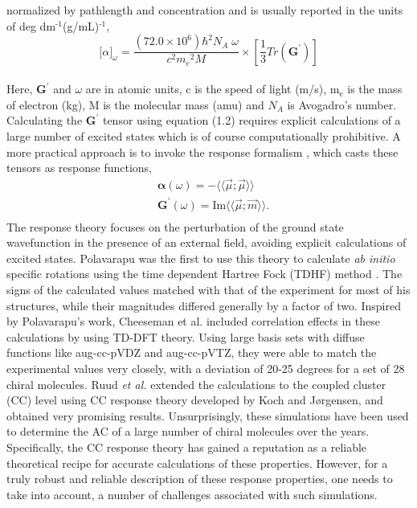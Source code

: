 normalized by pathlength and concentration and is usually reported in the units of deg dm$^{\text{-1}}$(g/mL)$^{\text{-1}}$,\cite{Crawford06}
\\
\begin{equation}
{\lbrack\alpha\rbrack}_{\omega} = \frac{(72.0 \times 10^6){\hbar}^2 N_A\;\omega}{c^2{m_e}^2 M} \times \left[ \frac{1}{3}Tr(\textbf{G}^\prime)\right]
\end{equation}
\\
Here, $\textbf{G}^\prime$ and $\omega$ are in atomic units, c is the speed of light (m/s), m$_{\text{e}}$ is the 
mass of electron (kg), M is the molecular mass (amu) and $N_A$ is Avogadro's number. Calculating the 
$\textbf{G}^\prime$ tensor using equation (1.2) requires explicit calculations of a large number of 
excited states which is of course computationally prohibitive. A more practical approach is to invoke the response formalism
\cite{Kobayashi94,Koch90}, which casts these tensors as response functions,
\begin{equation}
\begin{split}
&\bm{\alpha}(\omega) = -\langle\langle\vec{\mu};\vec{\mu}\rangle\rangle\\
&\textbf{G}^{\prime}(\omega) = \text{Im}\langle\langle\vec{\mu};\vec{m}\rangle\rangle.\\
\end{split}
\end{equation} 
The response theory focuses on the perturbation of the ground state wavefunction in the presence of an external 
field, avoiding explicit calculations of excited states. Polavarapu was the first to use this theory to calculate 
{\em ab initio} specific rotations using the time dependent Hartree Fock (TDHF) method \cite{Polavarapu96}. 
The signs of the calculated values matched with that of the experiment for most of his structures, while their magnitudes 
differed generally by a factor of two. Inspired by Polavarapu's work, Cheeseman et al. \cite{Cheeseman00,Stephens01} 
included correlation effects in these calculations by using TD-DFT theory\cite{Runge84}. Using large basis sets with diffuse functions like 
aug-cc-pVDZ and aug-cc-pVTZ,\cite{Dunning89,Kendall92,Woon94} they were able to match the experimental values very closely, with a 
deviation of 20-25 degrees for a set of 28 chiral molecules. Ruud {\em et al.} extended the calculations to the coupled cluster (CC) level 
using CC response theory developed by Koch and J{\o}rgensen\cite{Koch90}, and obtained very 
promising results\cite{Ruud03}. Unsurprisingly, these simulations have been used to determine the AC of a large number of 
chiral molecules over the years\cite{Kondru99}. Specifically, the CC response theory has gained a reputation as  
a reliable theoretical recipe for accurate calculations of these properties. However, for a truly robust and reliable description of these response 
properties, one needs to take into account, a number of challenges associated with such simulations.
